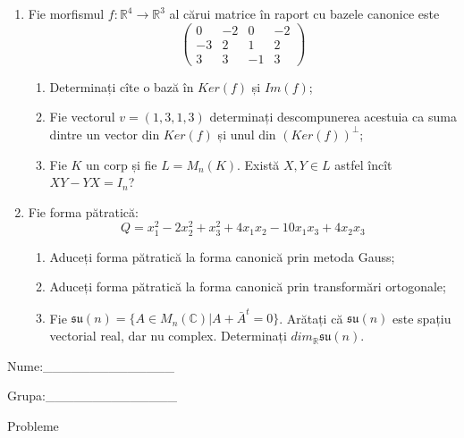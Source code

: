 \documentclass{article}
\begin{document}
\begin{enumerate}
 \item Fie morfismul $f:\mathbb{R}^4 \to \mathbb{R}^3$ al cărui matrice în raport cu bazele canonice este
$$\begin{pmatrix}
0&-2&0&-2\\
-3&2&1&2\\
3&3&-1&3
\end{pmatrix}$$

\begin{enumerate}
\item Determinați cîte o bază în $Ker(f)$ și $Im(f)$;
\item Fie vectorul $v=(1,3,1,3)$ determinați descompunerea acestuia ca suma dintre un vector din $Ker(f)$ și unul din $(Ker(f))^\perp$;
\item Fie $K$ un corp și fie $L=M_n(K)$. Există $X,Y \in L$ astfel încît $XY-YX=I_n$?  
\end{enumerate}
\item Fie forma pătratică:
$$Q= x_1^2-2x_2^2+x_3^2+4x_1x_2-10x_1x_3+4x_2x_3$$

\begin{enumerate}
\item Aduceți forma pătratică la forma canonică prin metoda Gauss;
\item Aduceți forma pătratică la forma canonică prin transformări ortogonale;
\item Fie $\mathfrak{su}(n)=\{ A \in M_n(\mathbb{C}) | A+\bar{A}^t=0\}$. Arătați că $\mathfrak{su}(n)$ este spațiu vectorial real, dar nu complex.
Determinați $dim_{\mathbb{R}}\mathfrak{su}(n)$.
\end{enumerate}
\end{enumerate}
\newpage
\begin{flushright}
Nume:\_\_\_\_\_\_\_\_\_\_\_\_\_\_
 
 
Grupa:\_\_\_\_\_\_\_\_\_\_\_\_\_\_
\end{flushright}
\begin{center}
\vspace{2cm}
{\Large Probleme}
\vspace{2cm}
\end{center}
\end{document}
